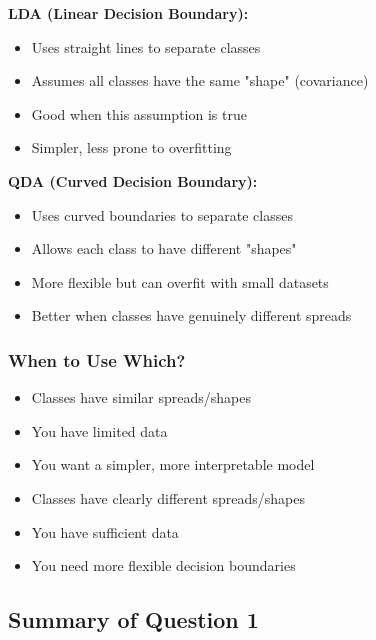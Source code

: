 \documentclass[12pt,a4paper]{article}
\begin{document}
\textbf{LDA (Linear Decision Boundary):}
\begin{itemize}
    \item Uses straight lines to separate classes
    \item Assumes all classes have the same "shape" (covariance)
    \item Good when this assumption is true
    \item Simpler, less prone to overfitting
\end{itemize}

\textbf{QDA (Curved Decision Boundary):}
\begin{itemize}
    \item Uses curved boundaries to separate classes
    \item Allows each class to have different "shapes"
    \item More flexible but can overfit with small datasets
    \item Better when classes have genuinely different spreads
\end{itemize}

\subsubsection{When to Use Which?}

\begin{tcolorbox}[colback=green!5!white,colframe=green!75!black,title=Use LDA when:]
\begin{itemize}
    \item Classes have similar spreads/shapes
    \item You have limited data
    \item You want a simpler, more interpretable model
\end{itemize}
\end{tcolorbox}

\begin{tcolorbox}[colback=blue!5!white,colframe=blue!75!black,title=Use QDA when:]
\begin{itemize}
    \item Classes have clearly different spreads/shapes
    \item You have sufficient data
    \item You need more flexible decision boundaries
\end{itemize}
\end{tcolorbox}

\subsection{Summary of Question 1}
\end{document}
